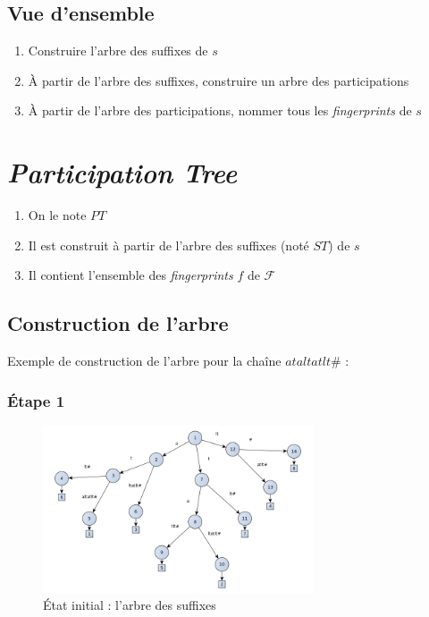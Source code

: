 \documentclass[a4paper]{article}
\begin{document}
\subsection{Vue d'ensemble}
	
\begin{enumerate}
	\item Construire l'arbre des suffixes de $s$
	\item À partir de l'arbre des suffixes, construire un arbre des participations
	\item À partir de l'arbre des participations, nommer tous les \textit{fingerprints} de $s$
\end{enumerate}

\section{\textit{Participation Tree}}

\begin{enumerate}
	\item On le note $PT$
	\item Il est construit à partir de l'arbre des suffixes (noté $ST$) de $s$
	\item Il contient l'ensemble des \emph{fingerprints} $f$ de $\mathcal{F}$
\end{enumerate}

\subsection{Construction de l'arbre}

Exemple de construction de l'arbre pour la chaîne $ataltatlt\#$ :

\subsubsection{Étape 1}

\begin{figure}[ht!]
\centering
\includegraphics[width=80mm]{./slides/img/construction-0.png}
\caption{État initial : l'arbre des suffixes}
\label{overflow}
\end{figure}
\end{document}
